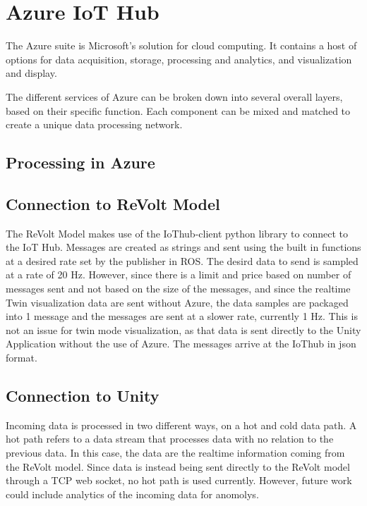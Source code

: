 \chapter{Azure IoT Hub}

The Azure suite is Microsoft's solution for cloud computing. It contains a host of options for data acquisition, storage, processing and analytics, and visualization and display.


The different services of Azure can be broken down into several overall layers, based on their specific function. Each component can be mixed and matched to create a unique data processing network.

\section{Processing in Azure}


\section{Connection to ReVolt Model}
The ReVolt Model makes use of the IoThub-client python library to connect to the IoT Hub. Messages are created as strings and sent using the built in functions at a desired rate set by the publisher in ROS. The desird data to send is sampled at a rate of 20 Hz. However, since there is a limit and price based on number of messages sent and not based on the size of the messages, and since the realtime Twin visualization data are sent without Azure, the data samples are packaged into 1 message and the messages are sent at a slower rate, currently 1 Hz. This is not an issue for twin mode visualization, as that data is sent directly to the Unity Application without the use of Azure. The messages arrive at the IoThub in json format. 

\section{Connection to Unity}
Incoming data is processed in two different ways, on a hot and cold data path. A hot path refers to a data stream that processes data with no relation to the previous data. In this case, the data are the realtime information coming from the ReVolt model. Since data is instead being sent directly to the ReVolt model through a TCP web socket, no hot path is used currently. However, future work could include analytics of the incoming data for anomolys.

